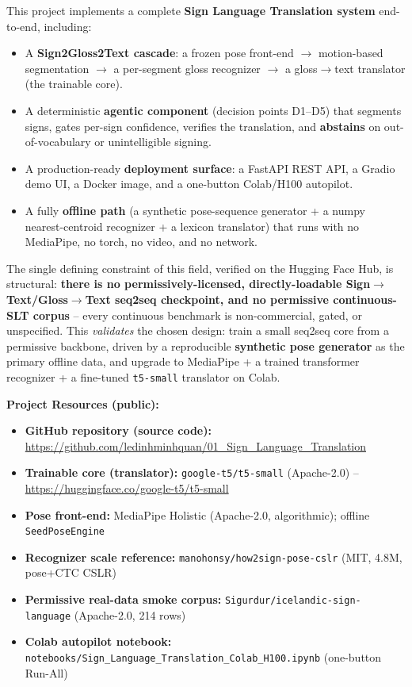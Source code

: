 \documentclass[12pt,a4paper]{article}
\begin{document}
This project implements a complete \textbf{Sign Language Translation system} end-to-end, including:
\begin{itemize}
  \item A \textbf{Sign2Gloss2Text cascade}: a frozen pose front-end $\rightarrow$ motion-based segmentation $\rightarrow$ a per-segment gloss recognizer $\rightarrow$ a gloss$\rightarrow$text translator (the trainable core).
  \item A deterministic \textbf{agentic component} (decision points D1--D5) that segments signs, gates per-sign confidence, verifies the translation, and \textbf{abstains} on out-of-vocabulary or unintelligible signing.
  \item A production-ready \textbf{deployment surface}: a FastAPI REST API, a Gradio demo UI, a Docker image, and a one-button Colab/H100 autopilot.
  \item A fully \textbf{offline path} (a synthetic pose-sequence generator + a numpy nearest-centroid recognizer + a lexicon translator) that runs with no MediaPipe, no torch, no video, and no network.
\end{itemize}

The single defining constraint of this field, verified on the Hugging Face Hub, is structural: \textbf{there is no permissively-licensed, directly-loadable Sign$\rightarrow$Text/Gloss$\rightarrow$Text seq2seq checkpoint, and no permissive continuous-SLT corpus} -- every continuous benchmark is non-commercial, gated, or unspecified. This \emph{validates} the chosen design: train a small seq2seq core from a permissive backbone, driven by a reproducible \textbf{synthetic pose generator} as the primary offline data, and upgrade to MediaPipe + a trained transformer recognizer + a fine-tuned \texttt{t5-small} translator on Colab.

\textbf{Project Resources (public):}
\begin{itemize}\setlength\itemsep{0.15em}
  \item \textbf{GitHub repository (source code):} \url{https://github.com/ledinhminhquan/01_Sign_Language_Translation}
  \item \textbf{Trainable core (translator):} \texttt{google-t5/t5-small} (Apache-2.0) -- \url{https://huggingface.co/google-t5/t5-small}
  \item \textbf{Pose front-end:} MediaPipe Holistic (Apache-2.0, algorithmic); offline \texttt{SeedPoseEngine}
  \item \textbf{Recognizer scale reference:} \texttt{manohonsy/how2sign-pose-cslr} (MIT, 4.8M, pose+CTC CSLR)
  \item \textbf{Permissive real-data smoke corpus:} \texttt{Sigurdur/icelandic-sign-language} (Apache-2.0, 214 rows)
  \item \textbf{Colab autopilot notebook:} \texttt{notebooks/Sign\_Language\_Translation\_Colab\_H100.ipynb} (one-button Run-All)
\end{itemize}
\end{document}

